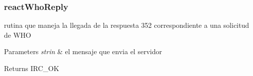  \hypertarget{reactWhoReply}{}\subsubsection{react\-Who\-Reply}\label{reactWhoReply}
rutina que maneja la llegada de la respuesta 352 correspondiente a una solicitud de W\-H\-O


\begin{DoxyParams}{Parameters}
{\em strin} & el mensaje que envia el servidor\\
\hline
\end{DoxyParams}
\begin{DoxyReturn}{Returns}
I\-R\-C\-\_\-\-O\-K
\end{DoxyReturn}


 